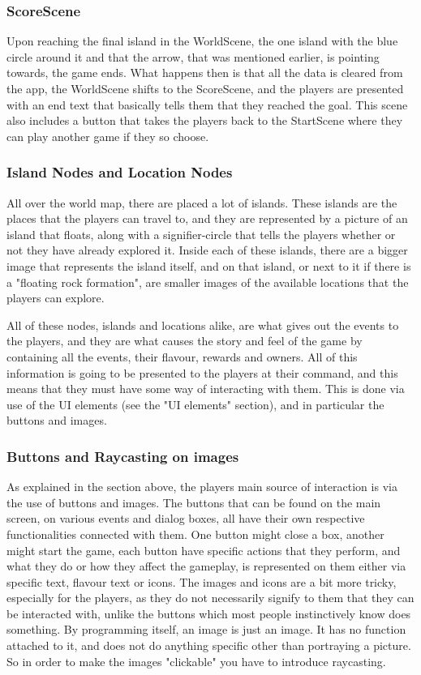 \subsubsection{ScoreScene}
Upon reaching the final island in the WorldScene, the one island with the blue circle around it and that the arrow, that was mentioned earlier, is pointing towards, the game ends. What happens then is that all the data is cleared from the app, the WorldScene shifts to the ScoreScene, and the players are presented with an end text that basically tells them that they reached the goal. This scene also includes a button that takes the players back to the StartScene where they can play another game if they so choose.

\subsubsection{Island Nodes and Location Nodes}
All over the world map, there are placed a lot of islands. These islands are the places that the players can travel to, and they are represented by a picture of an island that floats, along with a signifier-circle that tells the players whether or not they have already explored it. Inside each of these islands, there are a bigger image that represents the island itself, and on that island, or next to it if there is a "floating rock formation", are smaller images of the available locations that the players can explore. 

All of these nodes, islands and locations alike, are what gives out the events to the players, and they are what causes the story and feel of the game by containing all the events, their flavour, rewards and owners. All of this information is going to be presented to the players at their command, and this means that they must have some way of interacting with them. This is done via use of the UI elements (see the "UI elements" section), and in particular the buttons and images.

\subsubsection{Buttons and Raycasting on images}
As explained in the section above, the players main source of interaction is via the use of buttons and images. The buttons that can be found on the main screen, on various events and dialog boxes, all have their own respective functionalities connected with them. One button might close a box, another might start the game, each button have specific actions that they perform, and what they do or how they affect the gameplay, is represented on them either via specific text, flavour text or icons.
The images and icons are a bit more tricky, especially for the players, as they do not necessarily signify to them that they can be interacted with, unlike the buttons which most people instinctively know does something.
By programming itself, an image is just an image. It has no function attached to it, and does not do anything specific other than portraying a picture. So in order to make the images "clickable" you have to introduce raycasting.

